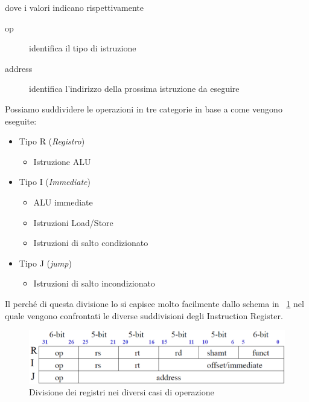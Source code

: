 dove i valori indicano rispettivamente
\begin{description}
\item[op] identifica il tipo di istruzione
\item[address] identifica l'indirizzo della prossima istruzione da eseguire
\end{description}
Possiamo suddividere le operazioni in tre categorie in base a come vengono eseguite:
\begin{itemize}
\item Tipo R (\emph{Registro})
\begin{itemize}
\item Istruzione ALU
\end{itemize}
\item Tipo I (\emph{Immediate})
\begin{itemize}
\item ALU immediate
\item Istruzioni Load/Store
\item Istruzioni di salto condizionato
\end{itemize}
\item Tipo J (\emph{jump})
\begin{itemize}
\item Istruzioni di salto incondizionato
\end{itemize}
\end{itemize}
Il perché di questa divisione lo si capisce molto facilmente dallo schema in \figurename~\ref{fig:rij} nel quale vengono confrontati le diverse suddivisioni degli Instruction Register.
\begin{figure}[htb]
\centering
\includegraphics[scale=0.5]{img/rij.png}
\caption{Divisione dei registri nei diversi casi di operazione}\label{fig:rij}
\end{figure}
